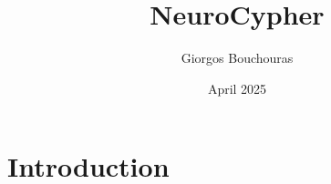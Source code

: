 \documentclass{article}
\title{NeuroCypher}
\author{Giorgos Bouchouras}
\date{April 2025}
\begin{document}
\maketitle

\section{Introduction}
\end{document}
